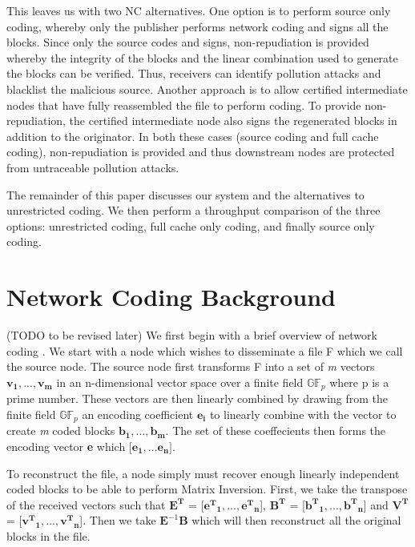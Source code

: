 This leaves us with two NC alternatives. One option is to perform source only coding, whereby only the publisher performs network coding and signs all the blocks. Since only the source codes and signs, non-repudiation is provided whereby the integrity of the blocks and the linear combination used to generate the blocks can be verified. Thus, receivers can identify pollution attacks and blacklist the malicious source. Another approach is to allow certified intermediate nodes that have fully reassembled the file to perform coding. To provide non-repudiation, the certified  intermediate node also signs the regenerated blocks in addition to the originator. In both these cases (source coding and full cache coding), non-repudiation is provided and thus downstream nodes are protected from untraceable pollution attacks.

The remainder of this paper discusses our system and the alternatives to unrestricted coding. We then perform a throughput comparison of the three options: unrestricted coding, full cache only coding, and finally source only coding.




\section{Network Coding Background} (TODO to be revised later)
We first begin with a brief overview of network coding \cite{ho2006random,fragouli2006network}. We start with a node which wishes to disseminate a file F which we call the source node. The source node first transforms F into a set of \textit{m} vectors $\mathbf{v_1, ..., v_m}$ in an n-dimensional vector space over a finite field $\mathbb{GF}_p$ where p is a prime number. These vectors are then linearly combined by drawing from the finite field $\mathbb{GF}_p$ an encoding coefficient $\mathbf{e_i}$ to linearly combine with the vector to create \textit{m} coded blocks $\mathbf{b_1, ..., b_m}$. The set of these coeffecients then forms the encoding vector \textbf{e} which [$\mathbf{e_1,...e_n}]$.


To reconstruct the file, a node simply must recover enough linearly independent coded blocks to be able to perform Matrix Inversion. First, we take the transpose of the received vectors such that $\mathbf{E^T}$ = [$\mathbf{{e^T}_{1}, ..., {e^T}_{n}}$], $\mathbf{B^T}$ = [$\mathbf{{b^T}_{1},...,{b^T}_{n}}$] and $\mathbf{V^T}$ = [$\mathbf{{v^T}_{1},...,{v^T}_{n}}$]. Then we take $\mathbf{E}^{-1}\mathbf{B}$ which will then reconstruct all the original blocks in the file.


